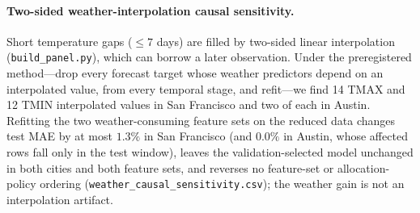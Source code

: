 \paragraph{Two-sided weather-interpolation causal sensitivity.}
Short temperature gaps ($\le 7$ days) are filled by two-sided linear
interpolation (\texttt{build\_panel.py}), which can borrow a later
observation. Under the preregistered method---drop every forecast target
whose weather predictors depend on an interpolated value, from every
temporal stage, and refit---we find 14 TMAX and 12 TMIN interpolated
values in San Francisco and two of each in Austin. Refitting the two
weather-consuming feature sets on the reduced data changes test MAE by at
most $1.3\%$ in San Francisco (and $0.0\%$ in Austin, whose affected
rows fall only in the test window), leaves the validation-selected model
unchanged in both cities and both feature sets, and reverses no
feature-set or allocation-policy ordering
(\texttt{weather\_causal\_sensitivity.csv}); the weather gain is not an
interpolation artifact.
\endgroup

